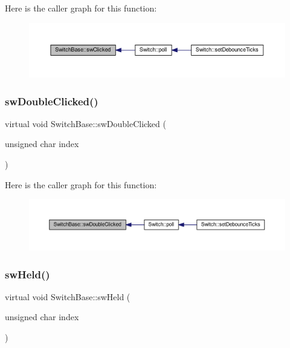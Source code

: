 Here is the caller graph for this function\+:
\nopagebreak
\begin{figure}[H]
\begin{center}
\leavevmode
\includegraphics[width=350pt]{class_switch_base_aa351081e25dc6a74959c1ec49f972fb5_icgraph}
\end{center}
\end{figure}
\mbox{\label{class_switch_base_a120bac96086b295783809866e3afd390}} 
\subsubsection{\texorpdfstring{sw\+Double\+Clicked()}{swDoubleClicked()}}
{\footnotesize\ttfamily virtual void Switch\+Base\+::sw\+Double\+Clicked (\begin{DoxyParamCaption}\item[{unsigned char}]{index }\end{DoxyParamCaption})\hspace{0.3cm}{\ttfamily [pure virtual]}}

Here is the caller graph for this function\+:
\nopagebreak
\begin{figure}[H]
\begin{center}
\leavevmode
\includegraphics[width=350pt]{class_switch_base_a120bac96086b295783809866e3afd390_icgraph}
\end{center}
\end{figure}
\mbox{\label{class_switch_base_a074fca26f56e9253ddd86720f7840440}} 
\subsubsection{\texorpdfstring{sw\+Held()}{swHeld()}}
{\footnotesize\ttfamily virtual void Switch\+Base\+::sw\+Held (\begin{DoxyParamCaption}\item[{unsigned char}]{index }\end{DoxyParamCaption})\hspace{0.3cm}{\ttfamily [pure virtual]}}

